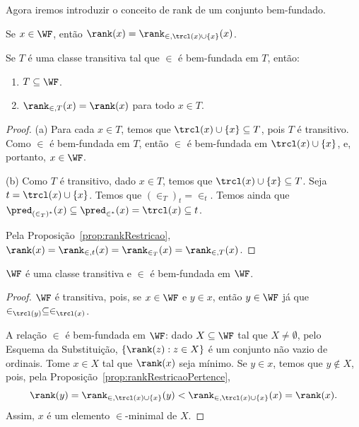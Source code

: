 Agora iremos introduzir o conceito de rank de um conjunto bem-fundado.

\begin{definition}[$\ZFmP$]
    Se $x \in \WF$, então $\rank(x)=\rank_{\in, \trcl(x)\cup\{x\}}(x)$.
\end{definition}

\begin{proposition}[$\ZFmP$]\label{prop:rankRestricaoPertence}
    Se $T$ é uma classe transitiva tal que $\in$ é bem-fundada em $T$, então:
    \begin{enumerate}[label=(\alph*)]
        \item $T\subseteq \WF$.
        \item $\rank_{\in, T}(x)=\rank(x)$ para todo $x\in T$.
    \end{enumerate}
\end{proposition}
\begin{proof}
    (a) Para cada $x\in T$, temos que $\trcl(x)\cup\{x\}\subseteq T$, pois $T$ é transitivo.
    Como $\in$ é bem-fundada em $T$, então $\in$ é bem-fundada em $\trcl(x)\cup\{x\}$, e, portanto, $x\in \WF$.

    (b) Como $T$ é transitivo, dado $x \in T$, temos que $\trcl(x)\cup\{x\}\subseteq T$.
    Seja $t=\trcl(x)\cup\{x\}$.
    Temos que $(\in_{T})_t=\in_t$.
    Temos ainda que $\pred_{(\in_T)^*}(x)\subseteq\pred_{\in^*}(x)=\trcl(x)\subseteq t$.
    
    Pela Proposição~\ref{prop:rankRestricao}, $\rank(x)=\rank_{\in, t}(x)=\rank_{\in_T}(x)=\rank_{\in, T}(x)$.
\end{proof}


\begin{proposition}[$\ZFmP$]
    $\WF$ é uma classe transitiva e $\in$ é bem-fundada em $\WF$.
\end{proposition}
\begin{proof}
    $\WF$ é transitiva, pois, se $x\in \WF$ e $y\in x$, então $y\in \WF$ já que $\in_{\trcl(y)}\subseteq \in_{\trcl(x)}$.

    A relação $\in$ é bem-fundada em $\WF$: dado $X\subseteq \WF$ tal que $X\neq\emptyset$, pelo Esquema da Substituição, $\{\rank(z):z\in X\}$ é um conjunto não vazio de ordinais.
    Tome $x\in X$ tal que $\rank(x)$ seja mínimo.
    Se $y\in x$, temos que $y\notin X$, pois, pela Proposição~\ref{prop:rankRestricaoPertence},
    \[
        \rank(y)=\rank_{\in,\trcl(x)\cup\{x\}}(y)<\rank_{\in,\trcl(x)\cup\{x\}}(x)=\rank(x).
    \]
    Assim, $x$ é um elemento $\in$-minimal de $X$.
\end{proof}

